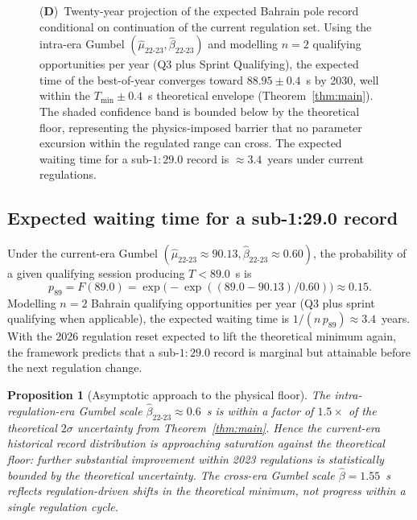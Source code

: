 \documentclass[11pt,twocolumn]{article}
\newtheorem{proposition}[theorem]{Proposition}
\theoremstyle{definition}
\theoremstyle{remark}
\begin{document}
\begin{figure}[!htbp]
{    (\textbf{D})~Twenty-year projection of the expected Bahrain pole record conditional on continuation of the current regulation set. Using the intra-era Gumbel $(\hat\mu_{22\text{-}23}, \hat\beta_{22\text{-}23})$ and modelling $n = 2$ qualifying opportunities per year (Q3 plus Sprint Qualifying), the expected time of the best-of-year converges toward $88.95 \pm 0.4$~s by 2030, well within the $T_{\min} \pm 0.4$~s theoretical envelope (Theorem~\ref{thm:main}). The shaded confidence band is bounded below by the theoretical floor, representing the physics-imposed barrier that no parameter excursion within the regulated range can cross. The expected waiting time for a sub-$1\!:\!29.0$ record is $\approx 3.4$~years under current regulations.}
    \label{fig:panel4}
\end{figure}

\subsection{Expected waiting time for a sub-1:29.0 record}

Under the current-era Gumbel $(\hat\mu_{22\text{-}23} \approx 90.13,
\hat\beta_{22\text{-}23} \approx 0.60)$, the probability of a given
qualifying session producing $T < 89.0$~s is
\[
  p_{89} = F(89.0) = \exp\!\bigl(-\exp((89.0 - 90.13)/0.60)\bigr) \approx 0.15.
\]
Modelling $n=2$ Bahrain qualifying opportunities per year (Q3 plus sprint
qualifying when applicable), the expected waiting time is
$1/(n\,p_{89}) \approx 3.4$~years. With the 2026 regulation reset expected
to lift the theoretical minimum again, the framework predicts that a
sub-$1\!:\!29.0$ record is marginal but attainable before the next
regulation change.

\begin{proposition}[Asymptotic approach to the physical floor]
\label{prop:asymptotic}
The intra-regulation-era Gumbel scale
$\hat\beta_{22\text{-}23} \approx 0.6$~s is within a factor of $1.5\times$ of
the theoretical $2\sigma$ uncertainty from Theorem~\ref{thm:main}. Hence the
current-era historical record distribution is approaching saturation against
the theoretical floor: further substantial improvement within 2023
regulations is statistically bounded by the theoretical uncertainty. The
cross-era Gumbel scale $\hat\beta = 1.55$~s reflects regulation-driven shifts
in the theoretical minimum, not progress within a single regulation cycle.
\end{proposition}

\end{document}
